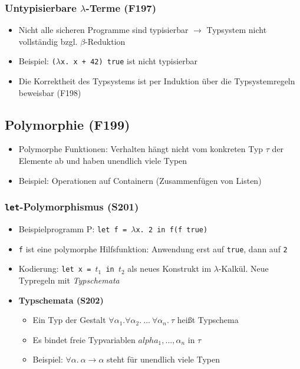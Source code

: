 \subsubsection{Untypisierbare \(\lambda\)-Terme (F197)}
\begin{itemize}
	\item Nicht alle sicheren Programme sind typisierbar \(\rightarrow\) Typsystem nicht vollständig bzgl. \(\beta\)-Reduktion
	\item Beispiel: \texttt{(\(\lambda\)x. x + 42) true} ist nicht typisierbar
	\item Die Korrektheit des Typsystems ist per Induktion über die Typsystemregeln beweisbar (F198)
\end{itemize}


\subsection{Polymorphie (F199)}
\begin{itemize}
	\item Polymorphe Funktionen: Verhalten hängt nicht vom konkreten Typ \(\tau\) der Elemente ab und haben unendlich viele Typen
	\item Beispiel: Operationen auf Containern (Zusammenfügen von Listen)
\end{itemize}

\subsubsection{\texttt{let}-Polymorphismus (S201)}
\begin{itemize}
	\item Beispielprogramm P: \texttt{let f = \(\lambda\)x. 2 in f(f true)}
	\item \texttt{f} ist eine polymorphe Hilfsfunktion: Anwendung erst auf \texttt{true}, dann auf \texttt{2}
	\item Kodierung: \texttt{let x = \(t_1\) in \(t_2\)} als neues Konstrukt im \(\lambda\)-Kalkül. Neue Typregeln mit \textit{Typschemata}
	\item \textbf{Typschemata (S202)}
	\begin{itemize}
		\item Ein Typ der Gestalt \(\forall\alpha_1.\forall\alpha_2.~...~\forall\alpha_n.~\tau\) heißt Typschema
		\item Es bindet freie Typvariablen \(alpha_1,...,\alpha_n\) in \(\tau\)
		\item Beispiel: \(\forall\alpha.~\alpha\rightarrow\alpha\) steht für unendlich viele Typen
	\end{itemize}
\end{itemize}


